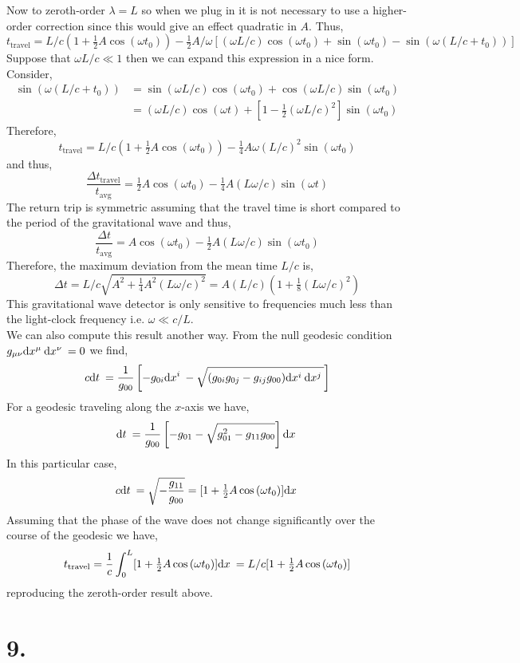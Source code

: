 \documentclass[12pt]{article}
\begin{document}
Now to zeroth-order $\lambda = L$ so when we plug in it is not necessary to use a higher-order correction since this would give an effect quadratic in $A$. Thus,
\[ t_{\text{travel}} = L/c (1 + \tfrac{1}{2} A \cos{(\omega t_0)}) - \tfrac{1}{2} A/\omega  \left[ (\omega L / c) \cos{(\omega t_0)} + \sin{(\omega t_0)} - \sin{(\omega(L/c + t_0))} \right] \]
Suppose that $\omega L / c \ll 1$ then we can expand this expression in a nice form. Consider,
\begin{align*}
\sin{(\omega(L / c + t_0))} & = \sin{(\omega L /c)} \cos{(\omega t_0)} + \cos{(\omega L / c)} \sin{(\omega t_0)}
\\
& =  (\omega L / c) \cos{(\omega t)} + \left[ 1 - \tfrac{1}{2}  (\omega L / c)^2 \right] \sin{(\omega t_0)} 
\end{align*}
Therefore,
\[ t_{\text{travel}} = L/c (1 + \tfrac{1}{2} A \cos{(\omega t_0)}) - \tfrac{1}{4} A \omega (L / c)^2  \sin{(\omega t_0)}  \]
and thus,
\[ \frac{\Delta t_{\text{travel}}}{t_{\text{avg}}} = \tfrac{1}{2} A \cos{(\omega t_0)} - \tfrac{1}{4} A (L \omega / c) \sin{(\omega t)} \]
The return trip is symmetric assuming that the travel time is short compared to the period of the gravitational wave and thus,
\[ \frac{\Delta t}{t_{\text{avg}}} = A \cos{(\omega t_0)} - \tfrac{1}{2} A (L \omega / c) \sin{(\omega t_0)} \]
Therefore, the maximum deviation from the mean time $L / c$ is,
\[ \Delta t = L / c \sqrt{ A^2 + \tfrac{1}{4} A^2 (L \omega / c)^2 } = A (L / c) (1 + \tfrac{1}{8} (L \omega / c)^2) \]
This gravitational wave detector is only sensitive to frequencies much less than the light-clock frequency i.e. $\omega \ll c / L$. 
\bigskip\\
We can also compute this result another way. From the null geodesic condition $g_{\mu \nu} \mathrm{d}x^\mu \: \mathrm{d}x^\nu \: = 0$ we find,
\[ c \mathrm{d}t \: = \frac{1}{g_{00}} \left[ - g_{0i} \mathrm{d}x^i \: - \sqrt{ (g_{0i} g_{0j} - g_{ij} g_{00}) \mathrm{d}x^i \: \mathrm{d}x^j \: } \right] \]
For a geodesic traveling along the $x$-axis we have,
\[ \mathrm{d}t \: = \frac{1}{g_{00}} \left[ - g_{01}  - \sqrt{g_{01}^2 - g_{11} g_{00}} \right] \mathrm{d}x \: \]
In this particular case,
\[ c \mathrm{d}t \: = \sqrt{-\frac{g_{11}}{g_{00}}} = [ 1 + \tfrac{1}{2} A \cos{(\omega t_0)} ] \mathrm{d}x \: \]
Assuming that the phase of the wave does not change significantly over the course of the geodesic we have,
\[ t_{\text{travel}} = \frac{1}{c} \int_0^L [ 1 + \tfrac{1}{2} A \cos{(\omega t_0)} ] \mathrm{d}x \: = L/c [ 1 + \tfrac{1}{2} A \cos{(\omega t_0)} ] \]
reproducing the zeroth-order result above. 

\section*{9.}
\end{document}
